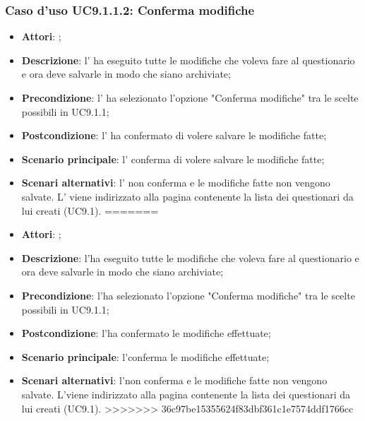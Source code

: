 					\subsubsection{Caso d'uso UC9.1.1.2: Conferma modifiche}
					\label{UC9.1.1.2}
					\begin{itemize}
<<<<<<< HEAD
						\item \textbf{Attori}: \uaupro{};
						\item \textbf{Descrizione}: l'\uaupro{} ha eseguito tutte le modifiche che voleva fare al questionario e ora deve salvarle in modo che siano archiviate;
						\item \textbf{Precondizione}: l'\uaupro{} ha selezionato l'opzione "Conferma modifiche" tra le scelte possibili in UC9.1.1;
						\item \textbf{Postcondizione}: l'\uaupro{} ha confermato di volere salvare le modifiche fatte;
						\item \textbf{Scenario principale}: l'\uaupro{} conferma di volere salvare le modifiche fatte;
						\item \textbf{Scenari alternativi}: l'\uaupro{} non conferma e le modifiche fatte non vengono salvate. L'\uaupro{} viene indirizzato alla pagina contenente la lista dei questionari da lui creati (UC9.1).
=======
						\item \textbf{Attori}: \uaupro;
						\item \textbf{Descrizione}: l'\uaupro ha eseguito tutte le modifiche che voleva fare al questionario e ora deve salvarle in modo che siano archiviate;
						\item \textbf{Precondizione}: l'\uaupro ha selezionato l'opzione "Conferma modifiche" tra le scelte possibili in UC9.1.1;
						\item \textbf{Postcondizione}: l'\uaupro ha confermato le modifiche effettuate;
						\item \textbf{Scenario principale}: l'\uaupro conferma le modifiche effettuate;
						\item \textbf{Scenari alternativi}: l'\uaupro non conferma e le modifiche fatte non vengono salvate. L'\uaupro viene indirizzato alla pagina contenente la lista dei questionari da lui creati (UC9.1).
>>>>>>> 36c97be15355624f83dbf361c1e7574ddf1766cc
					\end{itemize}
										
